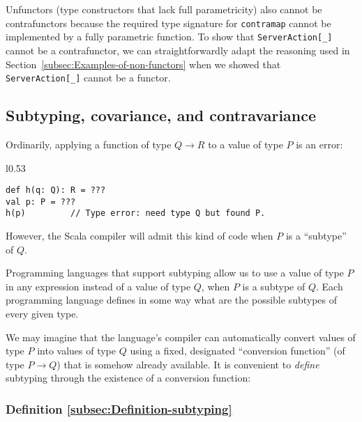 Unfunctors (type constructors that lack full parametricity)
also cannot be contrafunctors because the required type signature
for \lstinline!contramap! cannot be implemented by a fully parametric
function. To show that \lstinline!ServerAction[_]! cannot be a contrafunctor,
we can straightforwardly adapt the reasoning used in Section~\ref{subsec:Examples-of-non-functors}
when we showed that \lstinline!ServerAction[_]! cannot be a functor.

\subsection{Subtyping, covariance, and contravariance\label{subsec:Covariance,-contravariance,-and-subtyping}}

Ordinarily, applying a function of type $Q\rightarrow R$ to a value
of type $P$ is an error:

\begin{wrapfigure}{l}{0.53\columnwidth}%
\vspace{-0.8\baselineskip}

\begin{lstlisting}
def h(q: Q): R = ???
val p: P = ???
h(p)         // Type error: need type Q but found P.
\end{lstlisting}

\vspace{-0.8\baselineskip}
\end{wrapfigure}%

\noindent However, the Scala compiler will admit this kind of code
when $P$ is a \textsf{``}subtype\textsf{''} of $Q$. 

Programming languages that support subtyping allow us to use a value
of type $P$ in any expression instead of a value of type $Q$, when
$P$ is a subtype of $Q$. Each programming language defines in some
way what are the possible subtypes of every given type. 

We may imagine that the language\textsf{'}s compiler can automatically convert
values of type $P$ into values of type $Q$ using a fixed, designated
\textsf{``}conversion function\textsf{''} (of type $P\rightarrow Q$) that is somehow
already available. It is convenient to \emph{define} subtyping through
the existence of a conversion function:

\subsubsection{Definition \label{subsec:Definition-subtyping}\ref{subsec:Definition-subtyping} }

